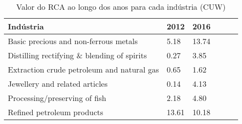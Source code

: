 \begin{table}
\centering
\caption{Valor do RCA ao longo dos anos para cada indústria (CUW)}
\begin{tabular}{p{6cm}p{1.5cm}p{1.5cm}p{1.5cm}p{1.5cm}p{1.5cm}}
\toprule
                                  Indústria &  2012 &  2016 \\
\midrule
      Basic precious and non-ferrous metals &  5.18 & 13.74 \\
Distilling rectifying \& blending of spirits &  0.27 &  3.85 \\
 Extraction crude petroleum and natural gas &  0.65 &  1.62 \\
             Jewellery and related articles &  0.14 &  4.13 \\
              Processing/preserving of fish &  2.18 &  4.80 \\
                 Refined petroleum products & 13.61 & 10.18 \\
\bottomrule
\end{tabular}
\end{table}
